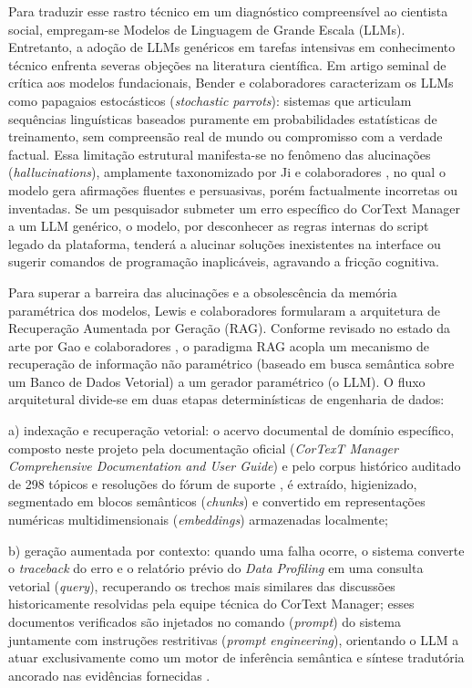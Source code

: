 \documentclass[
	oneside,
	a4paper,
	12pt,
	chapter=TITLE,
	section=TITLE,
	english,
	brazilian
]{abntex2}
\begin{document}
Para traduzir esse rastro técnico em um diagnóstico compreensível ao cientista social, empregam-se Modelos de Linguagem de Grande Escala (LLMs). Entretanto, a adoção de LLMs genéricos em tarefas intensivas em conhecimento técnico enfrenta severas objeções na literatura científica. Em artigo seminal de crítica aos modelos fundacionais, Bender e colaboradores \cite{Bender2021} caracterizam os LLMs como papagaios estocásticos (\textit{stochastic parrots}): sistemas que articulam sequências linguísticas baseados puramente em probabilidades estatísticas de treinamento, sem compreensão real de mundo ou compromisso com a verdade factual. Essa limitação estrutural manifesta-se no fenômeno das alucinações (\textit{hallucinations}), amplamente taxonomizado por Ji e colaboradores \cite{Ji2023}, no qual o modelo gera afirmações fluentes e persuasivas, porém factualmente incorretas ou inventadas. Se um pesquisador submeter um erro específico do CorText Manager a um LLM genérico, o modelo, por desconhecer as regras internas do script legado da plataforma, tenderá a alucinar soluções inexistentes na interface ou sugerir comandos de programação inaplicáveis, agravando a fricção cognitiva.

Para superar a barreira das alucinações e a obsolescência da memória paramétrica dos modelos, Lewis e colaboradores \cite{Lewis2020} formularam a arquitetura de Recuperação Aumentada por Geração (RAG). Conforme revisado no estado da arte por Gao e colaboradores \cite{Gao2023}, o paradigma RAG acopla um mecanismo de recuperação de informação não paramétrico (baseado em busca semântica sobre um Banco de Dados Vetorial) a um gerador paramétrico (o LLM). O fluxo arquitetural divide-se em duas etapas determinísticas de engenharia de dados:

\par\indent a) indexação e recuperação vetorial: o acervo documental de domínio específico, composto neste projeto pela documentação oficial (\textit{CorTexT Manager Comprehensive Documentation and User Guide}) e pelo corpus histórico auditado de 298 tópicos e resoluções do fórum de suporte \cite{CorText2026}, é extraído, higienizado, segmentado em blocos semânticos (\textit{chunks}) e convertido em representações numéricas multidimensionais (\textit{embeddings}) armazenadas localmente;
\par\indent b) geração aumentada por contexto: quando uma falha ocorre, o sistema converte o \textit{traceback} do erro e o relatório prévio do \textit{Data Profiling} em uma consulta vetorial (\textit{query}), recuperando os trechos mais similares das discussões historicamente resolvidas pela equipe técnica do CorText Manager; esses documentos verificados são injetados no comando (\textit{prompt}) do sistema juntamente com instruções restritivas (\textit{prompt engineering}), orientando o LLM a atuar exclusivamente como um motor de inferência semântica e síntese tradutória ancorado nas evidências fornecidas \cite{Lewis2020,Gao2023}.
\end{document}
